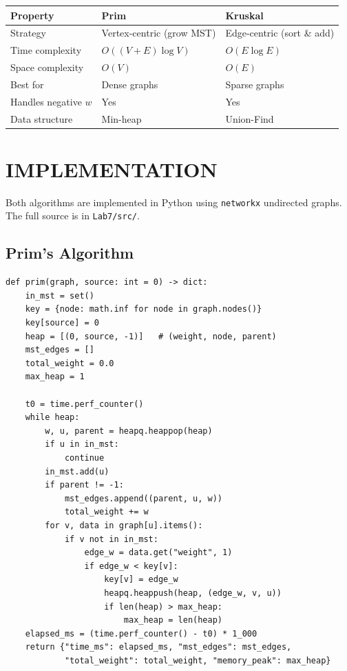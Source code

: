 \documentclass[12pt]{article}
\begin{document}
\begin{center}
\begin{tabular}{lll}
  \toprule
  \textbf{Property}      & \textbf{Prim}              & \textbf{Kruskal}         \\
  \midrule
  Strategy               & Vertex-centric (grow MST)  & Edge-centric (sort \& add) \\
  Time complexity        & $O((V+E)\log V)$           & $O(E \log E)$            \\
  Space complexity       & $O(V)$                     & $O(E)$                   \\
  Best for               & Dense graphs               & Sparse graphs            \\
  Handles negative $w$   & Yes                        & Yes                      \\
  Data structure         & Min-heap                   & Union-Find               \\
  \bottomrule
\end{tabular}
\end{center}

\section*{IMPLEMENTATION}

\hspace{0.8cm} Both algorithms are implemented in Python using \texttt{networkx}
undirected graphs. The full source is in \texttt{Lab7/src/}.

\subsection*{Prim's Algorithm}

\begin{lstlisting}[caption={Prim's algorithm using a binary min-heap}, label={lst:prim}]
def prim(graph, source: int = 0) -> dict:
    in_mst = set()
    key = {node: math.inf for node in graph.nodes()}
    key[source] = 0
    heap = [(0, source, -1)]   # (weight, node, parent)
    mst_edges = []
    total_weight = 0.0
    max_heap = 1

    t0 = time.perf_counter()
    while heap:
        w, u, parent = heapq.heappop(heap)
        if u in in_mst:
            continue
        in_mst.add(u)
        if parent != -1:
            mst_edges.append((parent, u, w))
            total_weight += w
        for v, data in graph[u].items():
            if v not in in_mst:
                edge_w = data.get("weight", 1)
                if edge_w < key[v]:
                    key[v] = edge_w
                    heapq.heappush(heap, (edge_w, v, u))
                    if len(heap) > max_heap:
                        max_heap = len(heap)
    elapsed_ms = (time.perf_counter() - t0) * 1_000
    return {"time_ms": elapsed_ms, "mst_edges": mst_edges,
            "total_weight": total_weight, "memory_peak": max_heap}
\end{lstlisting}
\end{document}

